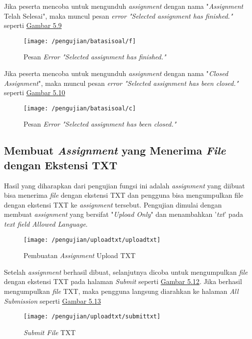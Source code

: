 	Jika peserta mencoba untuk mengunduh \textit{assignment} dengan nama "\textit{Assignment} Telah Selesai", maka muncul pesan \textit{error "Selected assignment has finished."} seperti \hyperref[fig:f]{Gambar 5.9} 
	\begin{figure}[H]
		\centering  
		\texttt{[image: /pengujian/batasisoal/f]}  
		\caption[Pesan\textit{ Error "Selected assignment has finished."}]{Pesan \textit{Error "Selected assignment has finished."}} 
		\label{fig:f} 
	\end{figure}

	Jika peserta mencoba untuk mengunduh \textit{assignment} dengan nama "\textit{Closed Assignment}", maka muncul pesan \textit{error "Selected assignment has been closed."} seperti \hyperref[fig:c]{Gambar 5.10} 
	\begin{figure}[H]
		\centering  
		\texttt{[image: /pengujian/batasisoal/c]}  
		\caption[Pesan \textit{Error "Selected assignment has been closed."}]{Pesan \textit{Error "Selected assignment has been closed."}} 
		\label{fig:c} 
	\end{figure}

	\subsection{Membuat \textit{Assignment} yang Menerima \textit{File} dengan Ekstensi TXT}
	Hasil yang diharapkan dari pengujian fungsi ini adalah \textit{assignment} yang diibuat bisa menerima \textit{file} dengan ekstensi TXT dan pengguna bisa mengumpulkan file dengan ekstensi TXT ke \textit{assignment} tersebut. Pengujian dimulai dengan membuat \textit{assignment} yang bersifat "\textit{Upload Only}" dan menambahkan '\textit{txt}' pada \textit{text field Allowed Language}.
	\begin{figure}[H]
		\centering  
		\texttt{[image: /pengujian/uploadtxt/uploadtxt]}  
		\caption[Pembuatan \textit{Assignment} Upload TXT]{Pembuatan \textit{Assignment} Upload TXT} 
		\label{fig:uploadtxt} 
	\end{figure}
	
	Setelah \textit{assignment} berhasil dibuat, selanjutnya dicoba untuk mengumpulkan \textit{file} dengan ekstensi TXT pada halaman \textit{Submit} seperti \hyperref[fig:submittxt]{Gambar 5.12}. Jika berhasil mengumpulkan \textit{file} TXT, maka pengguna langsung diarahkan ke halaman \textit{All Submission} seperti \hyperref[fig:resultttxt]{Gambar 5.13}
	
	\begin{figure}[H]
		\centering  
		\texttt{[image: /pengujian/uploadtxt/submittxt]}  
		\caption[\textit{Submit File} TXT]{\textit{Submit File} TXT} 
		\label{fig:submittxt} 
	\end{figure}

